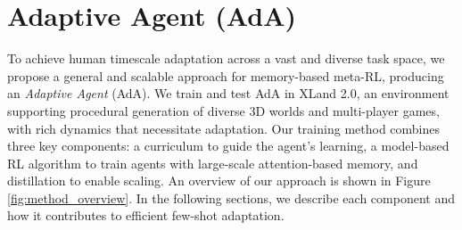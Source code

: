 \documentclass[11pt, a4paper, logo, copyright]{deepmind}
\begin{document}
\section{Adaptive Agent (AdA)}
To achieve human timescale adaptation across a vast and diverse task space, we propose a general and scalable approach for memory-based meta-RL, producing an \textit{Adaptive Agent} (AdA). We train and test AdA in XLand 2.0, an environment supporting procedural generation of diverse 3D worlds and multi-player games, with rich dynamics that necessitate adaptation. Our training method combines three key components: a curriculum to guide the agent's learning, a model-based RL algorithm to train agents with large-scale attention-based memory, and distillation to enable scaling. An overview of our approach is shown in Figure \ref{fig:method_overview}. In the following sections, we describe each component and how it contributes to efficient few-shot adaptation.
\end{document}

